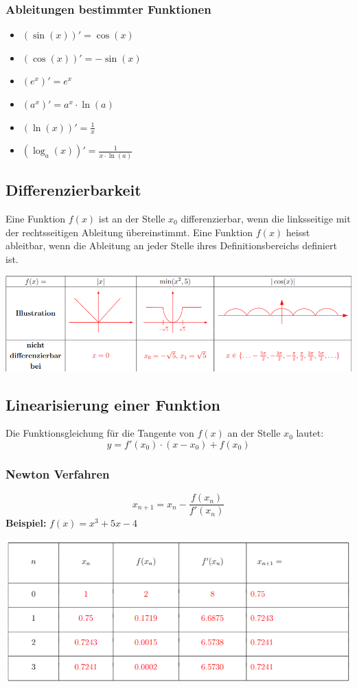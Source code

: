 \subsubsection{Ableitungen bestimmter Funktionen}
\begin{itemize}
    \item $(\sin(x))'= \cos(x)$
    \item $(\cos(x))'= -\sin(x)$
    \item $(e^x)'= e^x$
    \item $(a^x)'= a^x \cdot \ln(a)$
    \item $(\ln(x))'= \frac{1}{x}$
    \item $(\log_a(x))'= \frac{1}{x \cdot \ln(a)}$
\end{itemize}

\subsection{Differenzierbarkeit}
Eine Funktion $f(x)$ ist an der Stelle $x_0$ differenzierbar, wenn die linksseitige mit der rechtsseitigen Ableitung übereinstimmt.
Eine Funktion $f(x)$ heisst ableitbar, wenn die Ableitung an jeder Stelle ihres Definitionsbereichs definiert ist.

\begin{center}
    \includegraphics[width=1\linewidth]{images/differenzierbarkeit_beispiele.png}
\end{center}

\vfill

\subsection{Linearisierung einer Funktion}
Die Funktionsgleichung für die Tangente von $f(x)$ an der Stelle $x_0$ lautet:
\[
    y = f'(x_0) \cdot (x - x_0) + f(x_0)
\]

\subsubsection{Newton Verfahren}
\[
    x_{n+1} = x_n - \frac{f(x_n)}{f'(x_n)}
\]
\textbf{Beispiel: } $f(x) = x^3 + 5x -4$
\begin{center}
    \includegraphics[width=1\linewidth]{images/newton.png}
\end{center}

